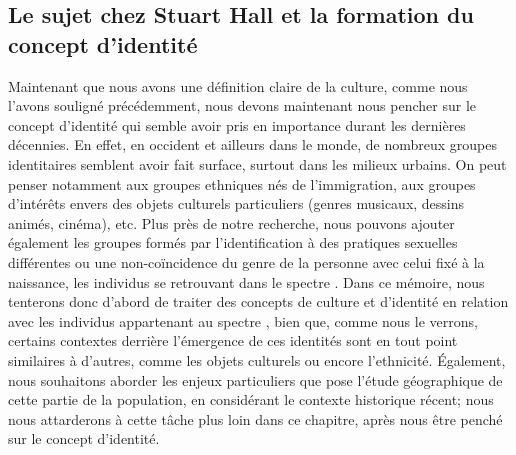 \subsection{Le sujet chez Stuart Hall et la formation du concept d'identité}
\label{subsec:sujet_et_identité} Maintenant que nous avons une définition claire de la culture, comme nous l'avons souligné précédemment, nous devons maintenant nous pencher sur le concept d'identité qui semble avoir pris en importance durant les dernières décennies.
En effet, en occident et ailleurs dans le monde, de nombreux groupes identitaires semblent avoir fait surface, surtout dans les milieux urbains.
On peut penser notamment aux groupes ethniques nés de l'immigration, aux groupes d'intérêts envers des objets culturels particuliers (genres musicaux, dessins animés, cinéma), etc.
Plus près de notre recherche, nous pouvons ajouter également les groupes formés par l'identification à des pratiques sexuelles différentes ou une non-coïncidence du genre de la personne avec celui fixé à la naissance, les individus se retrouvant dans le spectre \lgbt{}.
Dans ce mémoire, nous tenterons donc d'abord de traiter des concepts de culture et d'identité en relation avec les individus appartenant au spectre \lgbt{}, bien que, comme nous le verrons, certains contextes derrière l'émergence de ces identités sont en tout point similaires à d'autres, comme les objets culturels ou encore l'ethnicité.
Également, nous souhaitons aborder les enjeux particuliers que pose l'étude géographique de cette partie de la population, en considérant le contexte historique récent; nous nous attarderons à cette tâche plus loin dans ce chapitre, après nous être penché sur le concept d'identité.


